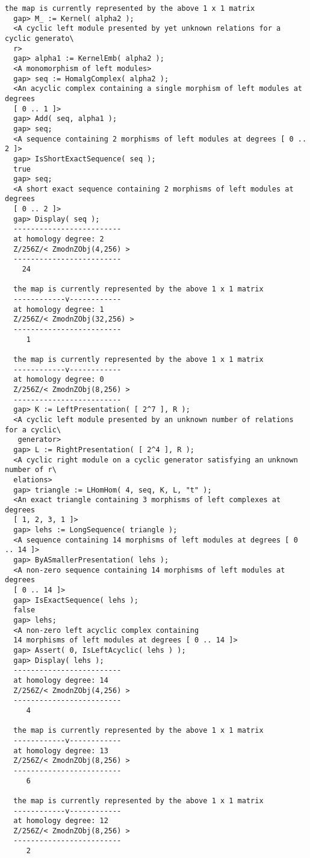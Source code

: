 \documentclass[a4paper,11pt]{report}
\begin{document}
{{\begin{Verbatim}[fontsize=\small,frame=single,label=Example]
  the map is currently represented by the above 1 x 1 matrix
  gap> M_ := Kernel( alpha2 );
  <A cyclic left module presented by yet unknown relations for a cyclic generato\
  r>
  gap> alpha1 := KernelEmb( alpha2 );
  <A monomorphism of left modules>
  gap> seq := HomalgComplex( alpha2 );
  <An acyclic complex containing a single morphism of left modules at degrees 
  [ 0 .. 1 ]>
  gap> Add( seq, alpha1 );
  gap> seq;
  <A sequence containing 2 morphisms of left modules at degrees [ 0 .. 2 ]>
  gap> IsShortExactSequence( seq );
  true
  gap> seq;
  <A short exact sequence containing 2 morphisms of left modules at degrees 
  [ 0 .. 2 ]>
  gap> Display( seq );
  -------------------------
  at homology degree: 2
  Z/256Z/< ZmodnZObj(4,256) > 
  -------------------------
    24
  
  the map is currently represented by the above 1 x 1 matrix
  ------------v------------
  at homology degree: 1
  Z/256Z/< ZmodnZObj(32,256) > 
  -------------------------
     1
  
  the map is currently represented by the above 1 x 1 matrix
  ------------v------------
  at homology degree: 0
  Z/256Z/< ZmodnZObj(8,256) > 
  -------------------------
  gap> K := LeftPresentation( [ 2^7 ], R );
  <A cyclic left module presented by an unknown number of relations for a cyclic\
   generator>
  gap> L := RightPresentation( [ 2^4 ], R );
  <A cyclic right module on a cyclic generator satisfying an unknown number of r\
  elations>
  gap> triangle := LHomHom( 4, seq, K, L, "t" );
  <An exact triangle containing 3 morphisms of left complexes at degrees 
  [ 1, 2, 3, 1 ]>
  gap> lehs := LongSequence( triangle );
  <A sequence containing 14 morphisms of left modules at degrees [ 0 .. 14 ]>
  gap> ByASmallerPresentation( lehs );
  <A non-zero sequence containing 14 morphisms of left modules at degrees 
  [ 0 .. 14 ]>
  gap> IsExactSequence( lehs );
  false
  gap> lehs;
  <A non-zero left acyclic complex containing 
  14 morphisms of left modules at degrees [ 0 .. 14 ]>
  gap> Assert( 0, IsLeftAcyclic( lehs ) );
  gap> Display( lehs );
  -------------------------
  at homology degree: 14
  Z/256Z/< ZmodnZObj(4,256) > 
  -------------------------
     4
  
  the map is currently represented by the above 1 x 1 matrix
  ------------v------------
  at homology degree: 13
  Z/256Z/< ZmodnZObj(8,256) > 
  -------------------------
     6
  
  the map is currently represented by the above 1 x 1 matrix
  ------------v------------
  at homology degree: 12
  Z/256Z/< ZmodnZObj(8,256) > 
  -------------------------
     2
  

\end{Verbatim}}}
\end{document}
